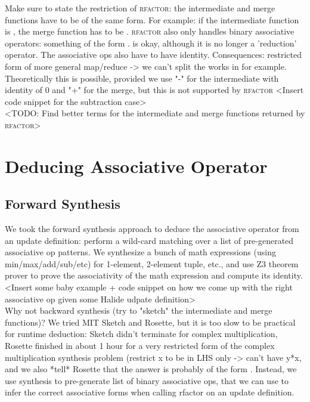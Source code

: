 Make sure to state the restriction of \textsc{rfactor}: the intermediate and merge functions have to be of the same form. For example: if the intermediate function is , the merge function has to be . \textsc{rfactor} also only handles binary associative operators: something of the form .  is okay, although it is no longer a 'reduction' operator. The associative ops also have to have identity. Consequences: restricted form of more general map/reduce -> we can't split the works in  for example. Theoretically this is possible, provided we use "-" for the intermediate with identity of 0 and "+" for the merge, but this is not supported by \textsc{rfactor} <Insert code snippet for the subtraction case> \\

<TODO: Find better terms for the intermediate and merge functions returned by \textsc{rfactor}> \\

\section{Deducing Associative Operator}

\subsection{Forward Synthesis}

We took the forward synthesis approach to deduce the associative operator from an update definition: perform a wild-card matching over a list of pre-generated associative op patterns. We synthesize a bunch of math expressions (using min/max/add/sub/etc) for 1-element, 2-element tuple, etc., and use Z3 theorem prover \cite{DeMoura:2008:ZES:1792734.1792766} to prove the associativity of the math expression and compute its identity. \\

<Insert some baby example + code snippet on how we come up with the right associative op given some Halide udpate definition> \\

Why not backward synthesis (try to "sketch" the intermediate and merge functions)? We tried MIT Sketch and Rosette, but it is too slow to be practical for runtime deduction: Sketch didn't terminate for complex multiplication, Rosette finished in about 1 hour for a very restricted form of the complex multiplication synthesis problem (restrict x to be in LHS only -> can't have y*x, and we also *tell* Rosette that the answer is probably of the form . Instead, we use synthesis to pre-generate list of binary associative ops, that we can use to infer the correct associative forms when calling rfactor on an update definition. \\

